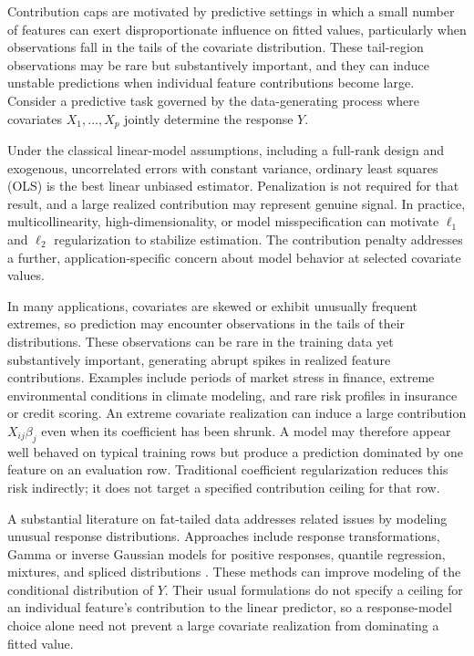 \documentclass[article,shortnames,nofooter]{jss}
\begin{document}
Contribution caps are motivated by predictive settings in which a small number of features can exert disproportionate influence on fitted values, particularly when observations fall in the tails of the covariate distribution. These tail-region observations may be rare but substantively important, and they can induce unstable predictions when individual feature contributions become large. Consider a predictive task governed by the data-generating process where covariates $X_1, \ldots, X_p$ jointly determine the response $Y$.

Under the classical linear-model assumptions, including a full-rank design and exogenous, uncorrelated errors with constant variance, ordinary least squares (OLS) is the best linear unbiased estimator. Penalization is not required for that result, and a large realized contribution may represent genuine signal. In practice, multicollinearity, high-dimensionality, or model misspecification can motivate $\ell_1$ and $\ell_2$ regularization to stabilize estimation. The contribution penalty addresses a further, application-specific concern about model behavior at selected covariate values.

In many applications, covariates are skewed or exhibit unusually frequent extremes, so prediction may encounter observations in the tails of their distributions. These observations can be rare in the training data yet substantively important, generating abrupt spikes in realized feature contributions. Examples include periods of market stress in finance, extreme environmental conditions in climate modeling, and rare risk profiles in insurance or credit scoring. An extreme covariate realization can induce a large contribution $X_{ij}\beta_j$ even when its coefficient has been shrunk. A model may therefore appear well behaved on typical training rows but produce a prediction dominated by one feature on an evaluation row. Traditional coefficient regularization reduces this risk indirectly; it does not target a specified contribution ceiling for that row.

A substantial literature on fat-tailed data addresses related issues by modeling unusual response distributions. Approaches include response transformations, Gamma or inverse Gaussian models for positive responses, quantile regression, mixtures, and spliced distributions \citep{shi2014,gan2018}. These methods can improve modeling of the conditional distribution of $Y$. Their usual formulations do not specify a ceiling for an individual feature's contribution to the linear predictor, so a response-model choice alone need not prevent a large covariate realization from dominating a fitted value.
\end{document}
